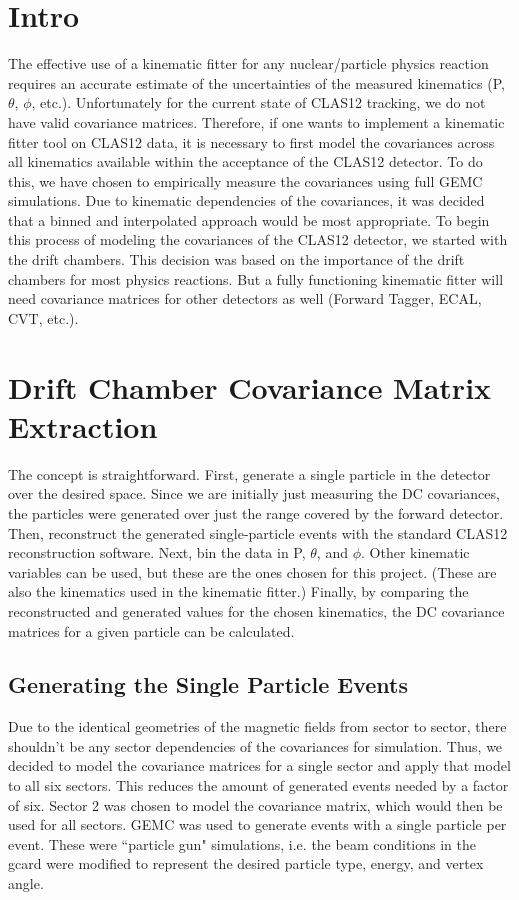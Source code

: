 \documentclass[showpacs,amsmath,amssymb,aps,prc,floatfix,showkeys,nofootinbib]{revtex4-1}
\begin{document}
\section{\label{intro}Intro}
The effective use of a kinematic fitter for any nuclear/particle physics reaction requires an accurate estimate of the uncertainties of the measured kinematics (P, $\theta$, $\phi$, etc.). Unfortunately for the current state of CLAS12 tracking, we do not have valid covariance matrices. Therefore, if one wants to implement a kinematic fitter tool on CLAS12 data, it is necessary to first model the covariances across all kinematics available within the acceptance of the CLAS12 detector. To do this, we have chosen to empirically measure the covariances using full GEMC simulations. Due to kinematic dependencies of the covariances, it was decided that a binned and interpolated approach would be most appropriate. To begin this process of modeling the covariances of the CLAS12 detector, we started with the drift chambers. This decision was based on the importance of the drift chambers for most physics reactions. But a fully functioning kinematic fitter will need covariance matrices for other detectors as well (Forward Tagger, ECAL, CVT, etc.). 

\section{\label{dc_covMat}Drift Chamber Covariance Matrix Extraction}
The concept is straightforward. First, generate a single particle in the detector over the desired space. Since we are initially just measuring the DC covariances, the particles were generated over just the range covered by the forward detector. Then, reconstruct the generated single-particle events with the standard CLAS12 reconstruction software. Next, bin the data in P, $\theta$, and $\phi$. Other kinematic variables can be used, but these are the ones chosen for this project. (These are also the kinematics used in the kinematic fitter.) Finally, by comparing the reconstructed and generated values for the chosen kinematics, the DC covariance matrices for a given particle can be calculated. 

\subsection{\label{gen}Generating the Single Particle Events}
Due to the identical geometries of the magnetic fields from sector to sector, there shouldn't be any sector dependencies of the covariances for simulation. Thus, we decided to model the covariance matrices for a single sector and apply that model to all six sectors. This reduces the amount of generated events needed by a factor of six. Sector 2 was chosen to model the covariance matrix, which would then be used for all sectors. GEMC was used to generate events with a single particle per event. These were ``particle gun" simulations, i.e. the beam conditions in the gcard were modified to represent the desired particle type, energy, and vertex angle. 
\end{document}
